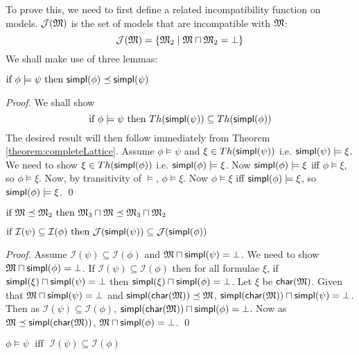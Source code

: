 To prove this, we need to first define a related incompatibility function on  models.
$\mathcal{J}(\frak{M})$ is the set of models that are incompatible with $\frak{M}$:
\[
\mathcal{J}(\frak{M}) = \{ \frak{M}_2 \; | \; \frak{M} \sqcap \frak{M}_2 = \bot \}
\]
We shall make use of three lemmas:
\begin{lemma}
\label{inc1}
$\mbox{if }\phi \models \psi \mbox{ then } \mathsf{simpl}(\phi) \preceq \mathsf{simpl}(\psi)$
\end{lemma}
\begin{proof}
We shall show
\[
\mbox{if } \phi \models \psi \mbox{ then } Th(\mathsf{simpl}(\psi)) \subseteq Th(\mathsf{simpl}(\phi))
\]
The desired result will then follow immediately from Theorem \ref{theorem:completeLattice}.
Assume $\phi \models \psi$ and $\xi \in Th(\mathsf{simpl}(\psi))$ i.e. $\mathsf{simpl}(\psi) \models \xi$. 
We need to show $\xi \in Th(\mathsf{simpl}(\phi))$ i.e. $\mathsf{simpl}(\phi) \models \xi$.
Now $\mathsf{simpl}(\phi) \models \xi$ iff $\phi \models \xi$, so $\phi \models \xi$.
Now, by transitivity of $\models$, $\phi \models \xi$.
Now $\phi \models \xi$ iff $\mathsf{simpl}(\phi) \models \xi$, so $\mathsf{simpl}(\phi) \models \xi$.
\qed
\end{proof}
\begin{lemma}
\label{inc2}
$\mbox{if }\frak{M} \preceq \frak{M}_2 \mbox{ then } \frak{M}_3 \sqcap \frak{M} \preceq \frak{M}_3 \sqcap \frak{M}_2$
\end{lemma}
\begin{lemma}
\label{inc3}
$\mbox{if }\mathcal{I}(\psi) \subseteq \mathcal{I}(\phi) \mbox{ then } \mathcal{J}(\mathsf{simpl}(\psi)) \subseteq \mathcal{J}(\mathsf{simpl}(\phi))$
\end{lemma}
\begin{proof}
Assume $\mathcal{I}(\psi) \subseteq \mathcal{I}(\phi)$ and $\frak{M} \sqcap \mathsf{simpl}(\psi) = \bot$.
We need to show $\frak{M} \sqcap \mathsf{simpl}(\phi) = \bot$.
If $\mathcal{I}(\psi) \subseteq \mathcal{I}(\phi)$ then for all formulae $\xi$, if $\mathsf{simpl}(\xi) \sqcap \mathsf{simpl}(\psi) = \bot$ then $\mathsf{simpl}(\xi) \sqcap \mathsf{simpl}(\phi) = \bot$.
Let $\xi$ be $\mathsf{char}(\frak{M})$.
Given that $\frak{M} \sqcap \mathsf{simpl}(\psi) = \bot$ and $\mathsf{simpl}(\mathsf{char}(\frak{M})) \preceq \frak{M}$, $\mathsf{simpl}(\mathsf{char}(\frak{M})) \sqcap \mathsf{simpl}(\psi) = \bot$.
Then as $\mathcal{I}(\psi) \subseteq \mathcal{I}(\phi)$, $\mathsf{simpl}(\mathsf{char}(\frak{M})) \sqcap \mathsf{simpl}(\phi) = \bot$.
Now as $\frak{M}  \preceq \mathsf{simpl}(\mathsf{char}(\frak{M}))$, $\frak{M} \sqcap \mathsf{simpl}(\phi) = \bot$.
\qed
\end{proof}

\begin{theorem}
$\phi \models \psi \; \mbox{ iff } \; \mathcal{I}(\psi) \subseteq \mathcal{I}(\phi)$
\end{theorem}

